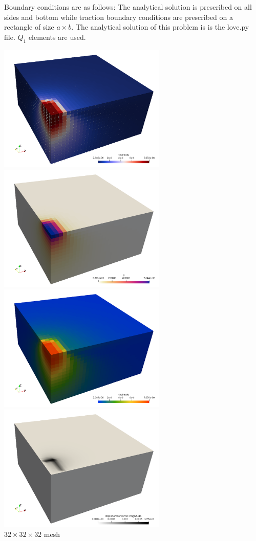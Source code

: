 Boundary conditions are as follows: The analytical solution is prescribed on 
all sides and bottom while traction boundary conditions are prescribed on a 
rectangle of size $a\times b$. 
The analytical solution of this problem is is the {\pythonfile love.py} file.
$Q_1$ elements are used. 

\begin{center}
\includegraphics[width=8cm]{python_codes/fieldstone_123/results/exp1/disp} 
\includegraphics[width=8cm]{python_codes/fieldstone_123/results/exp1/press} \\
\includegraphics[width=8cm]{python_codes/fieldstone_123/results/exp1/sr} 
\includegraphics[width=8cm]{python_codes/fieldstone_123/results/exp1/error} \\
{\captionfont $32\times 32\times 32$ mesh}
\end{center} 



